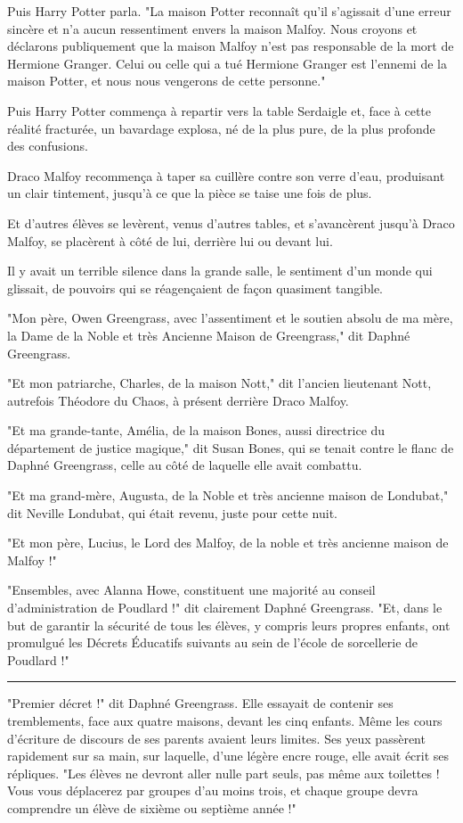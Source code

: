 Puis Harry Potter parla. "La maison Potter reconnaît qu'il s'agissait d'une erreur sincère et n'a aucun ressentiment envers la maison Malfoy. Nous croyons et déclarons publiquement que la maison Malfoy n'est pas responsable de la mort de Hermione Granger. Celui ou celle qui a tué Hermione Granger est l'ennemi de la maison Potter, et nous nous vengerons de cette personne."

Puis Harry Potter commença à repartir vers la table Serdaigle et, face à cette réalité fracturée, un bavardage explosa, né de la plus pure, de la plus profonde des confusions.

Draco Malfoy recommença à taper sa cuillère contre son verre d'eau, produisant un clair tintement, jusqu'à ce que la pièce se taise une fois de plus.

Et d'autres élèves se levèrent, venus d'autres tables, et s'avancèrent jusqu'à Draco Malfoy, se placèrent à côté de lui, derrière lui ou devant lui.

Il y avait un terrible silence dans la grande salle, le sentiment d'un monde qui glissait, de pouvoirs qui se réagençaient de façon quasiment tangible.

"Mon père, Owen Greengrass, avec l'assentiment et le soutien absolu de ma mère, la Dame de la Noble et très Ancienne Maison de Greengrass," dit Daphné Greengrass.

"Et mon patriarche, Charles, de la maison Nott," dit l'ancien lieutenant Nott, autrefois Théodore du Chaos, à présent derrière Draco Malfoy.

"Et ma grande-tante, Amélia, de la maison Bones, aussi directrice du département de justice magique," dit Susan Bones, qui se tenait contre le flanc de Daphné Greengrass, celle au côté de laquelle elle avait combattu.

"Et ma grand-mère, Augusta, de la Noble et très ancienne maison de Londubat," dit Neville Londubat, qui était revenu, juste pour cette nuit.

"Et mon père, Lucius, le Lord des Malfoy, de la noble et très ancienne maison de Malfoy !"

"Ensembles, avec Alanna Howe, constituent une majorité au conseil d'administration de Poudlard !" dit clairement Daphné Greengrass. "Et, dans le but de garantir la sécurité de tous les élèves, y compris leurs propres enfants, ont promulgué les Décrets Éducatifs suivants au sein de l'école de sorcellerie de Poudlard !"
\par\noindent\rule{\textwidth}{0.4pt}
"Premier décret !" dit Daphné Greengrass. Elle essayait de contenir ses tremblements, face aux quatre maisons, devant les cinq enfants. Même les cours d'écriture de discours de ses parents avaient leurs limites. Ses yeux passèrent rapidement sur sa main, sur laquelle, d'une légère encre rouge, elle avait écrit ses répliques. "Les élèves ne devront aller nulle part seuls, pas même aux toilettes ! Vous vous déplacerez par groupes d'au moins trois, et chaque groupe devra comprendre un élève de sixième ou septième année !"

